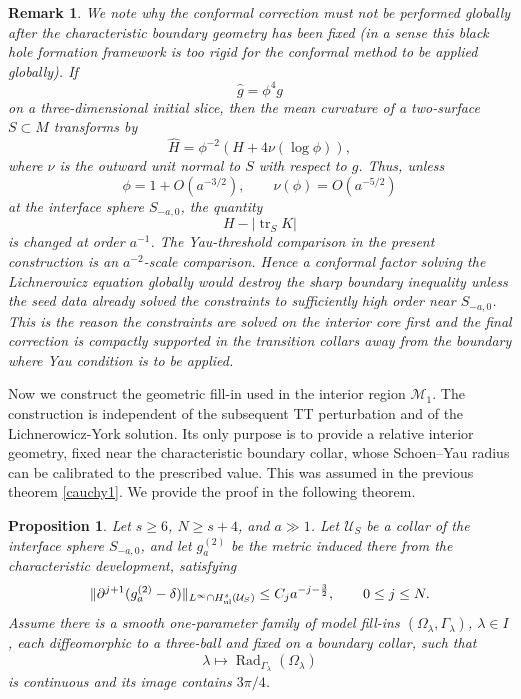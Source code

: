 \documentclass{amsart}
\newtheorem{remark}{Remark}
\newtheorem{proposition}{Proposition}[section]
\begin{document}
{\begin{remark}
We note why the conformal correction must not be performed
globally after the characteristic boundary geometry has been fixed (in a sense this black hole formation framework is too rigid for the conformal method to be applied globally). If
\[
        \widehat g=\phi^4g
\]
on a three-dimensional initial slice, then the mean curvature of a
two-surface \(S\subset M\) transforms by
\[
        \widehat H
        =
        \phi^{-2}
        \left(
        H+4\nu(\log\phi)
        \right),
\]
where \(\nu\) is the outward unit normal to \(S\) with respect to \(g\).
Thus, unless
\[
        \phi=1+O(a^{-3/2}),
        \qquad
        \nu(\phi)=O(a^{-5/2})
\]
at the interface sphere \(S_{-a,0}\), the quantity
\[
        H-|\operatorname{tr}_{S}K|
\]
is changed at order \(a^{-1}\). The Yau-threshold comparison in the
present construction is an \(a^{-2}\)-scale comparison. Hence a
conformal factor solving the Lichnerowicz equation globally would destroy the sharp boundary inequality unless
the seed data already solved the constraints to sufficiently high order
near \(S_{-a,0}\). This is the reason the constraints are solved on the
interior core first and the final correction is compactly supported in
the transition collars away from the boundary where Yau condition is to be applied.
\end{remark}


\noindent Now we construct the geometric fill-in used in the interior region
\(\mathcal M_1\). The construction is independent of the subsequent TT
perturbation and of the Lichnerowicz-York solution. Its only purpose is
to provide a relative interior geometry, fixed near the characteristic
boundary collar, whose Schoen--Yau radius can be calibrated to the
prescribed value. This was assumed in the previous theorem \ref{cauchy1}. We provide the proof in the following theorem.

\begin{proposition}
\label{cauchy2}
Let \(s\ge 6\), \(N\ge s+4\), and \(a\gg1\). Let
\(\mathcal U_S\) be a collar of the interface sphere \(S_{-a,0}\), and
let \(g_a^{(2)}\) be the metric induced there from the characteristic
development, satisfying
\[
        \|\partial^{j+1}(g_a^{(2)}-\delta)\|_{L^\infty\cap H^s_{\rm ul}(\mathcal U_S)}
        \le C_j a^{-j-\frac32},
        \qquad 0\le j\le N .
\]
Assume there is a smooth one-parameter family of model fill-ins
\((\Omega_\lambda,\Gamma_\lambda)\), \(\lambda\in I\), each diffeomorphic
to a three-ball and fixed on a boundary collar, such that
\[
        \lambda\mapsto \operatorname{Rad}_{\Gamma_\lambda}(\Omega_\lambda)
\]
is continuous and its image contains \(3\pi/4\).


\end{proposition}}
\end{document}
